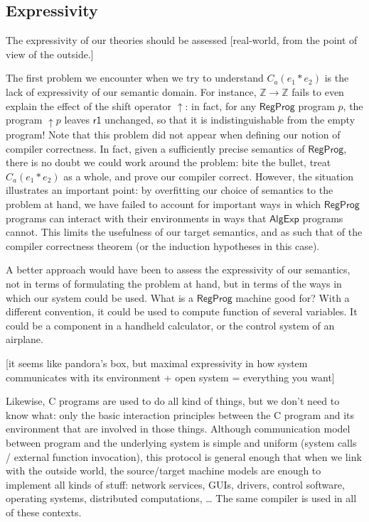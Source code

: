 \documentclass[acmsmall,10pt,review,anonymous]{acmart}
\newcommand{\kw}[1]{\ensuremath{ \textsf{#1} }}
\begin{document}
{\color{gray} %

\subsection{Expressivity} %

The expressivity of our theories
should be assessed
[real-world,
from the point of view of the outside.]

The first problem we encounter when we try to understand $C_a(e_1 * e_2)$
is the lack of expressivity of our semantic domain.
For instance,
$\mathbb{Z} \rightarrow \mathbb{Z}$
fails to even explain the effect of the shift operator $\uparrow$:
in fact, for any $\kw{RegProg}$ program $p$,
the program ${\uparrow}p$ leaves $\kw{r1}$ unchanged,
so that it is indistinguishable from the empty program!
Note that this problem did not appear
when defining our notion of compiler correctness.
In fact,
given a sufficiently precise semantics of $\kw{RegProg}$,
there is no doubt we could work around the problem:
bite the bullet, treat $C_a(e_1 * e_2)$ as a whole,
and prove our compiler correct.
However,
the situation illustrates an important point:
by overfitting our choice of semantics to the problem at hand,
we have failed to account for important ways in which
$\kw{RegProg}$ programs can interact with their environments
in ways that $\kw{AlgExp}$ programs cannot.
This limits the usefulness of our target semantics,
and as such that of the compiler correctness theorem
(or the induction hypotheses in this case).

A better approach would have been to
assess the expressivity of our semantics,
not in terms of formulating the problem at hand,
but in terms of the ways in which our system
could be used.
What is a $\kw{RegProg}$ machine good for?
With a different convention,
it could be used to compute function of several variables.
It could be a component in a handheld calculator,
or the control system of an airplane.

[it seems like pandora's box,
but maximal expressivity in how system communicates with its environment
+ open system = everything you want]

Likewise, C programs are used to do all kind of things,
but we don't need to know what:
only the basic interaction principles
between the C program and its environment that are involved
in those things.
Although communication model between program
and the underlying system is simple and uniform
(system calls / external function invocation),
this protocol is general enough that
when we link with the outside world,
the source/target machine models are enough to
implement all kinds of stuff:
network services, GUIs, drivers, control software,
operating systems, distributed computations, \ldots
The same compiler is used in all of these contexts.


} %
\end{document}
